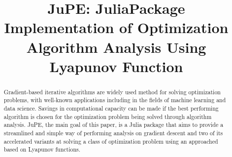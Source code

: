 \documentclass{thesis}
\title{JuPE: Julia\texttrademark  Package Implementation of Optimization Algorithm Analysis Using Lyapunov Function}
\theoremstyle{definition}
\begin{document}
\frontmatter

\maketitle

\begin{abstract}
  Gradient-based iterative algorithms are widely used method for solving optimization problems, with well-known applications including in the fields of machine learning and data science. Savings in computational capacity can be made if the best performing algorithm is chosen for the optimization problem being solved through algorithm analysis. JuPE, the main goal of this paper, is a Julia package that aims to provide a streamlined and simple way of performing analysis on gradient descent and two of its accelerated variants at solving a class of optimization problem using an approached based on Lyapunov functions.
\end{abstract}

\setcounter{page}{3}

\tableofcontents

\lof







\mainmatter







\appendices
% 

\backmatter


\renewcommand\bibname{References}

\end{document}
